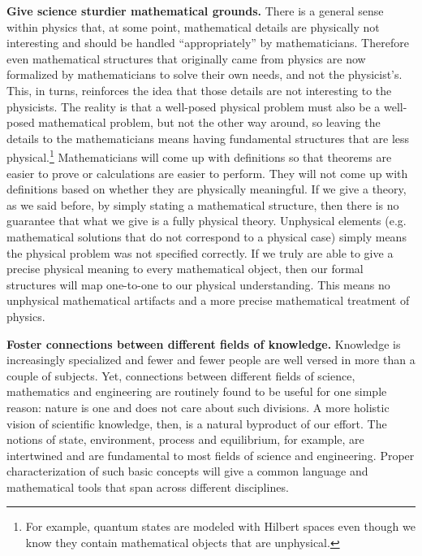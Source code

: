 \documentclass[twocolumn]{article}
\begin{document}
\textbf{Give science sturdier mathematical grounds.} There is a general sense within physics that, at some point, mathematical details are physically not interesting and should be handled ``appropriately'' by mathematicians. Therefore even mathematical structures that originally came from physics are now formalized by mathematicians to solve their own needs, and not the physicist's. This, in turns, reinforces the idea that those details are not interesting to the physicists. The reality is that a well-posed physical problem must also be a well-posed mathematical problem, but not the other way around, so leaving the details to the mathematicians means having fundamental structures that are less physical.\footnote{For example, quantum states are modeled with Hilbert spaces even though we know they contain mathematical objects that are unphysical.} Mathematicians will come up with definitions so that theorems are easier to prove or calculations are easier to perform. They will not come up with definitions based on whether they are physically meaningful. If we give a theory, as we said before, by simply stating a mathematical structure, then there is no guarantee that what we give is a fully physical theory. Unphysical elements (e.g. mathematical solutions that do not correspond to a physical case) simply means the physical problem was not specified correctly. If we truly are able to give a precise physical meaning to every mathematical object, then our formal structures will map one-to-one to our physical understanding. This means no unphysical mathematical artifacts and a more precise mathematical treatment of physics.

\textbf{Foster connections between different fields of knowledge.} Knowledge is increasingly specialized and fewer and fewer people are well versed in more than a couple of subjects. Yet, connections between different fields of science, mathematics and engineering are routinely found to be useful for one simple reason: nature is one and does not care about such divisions. A more holistic vision of scientific knowledge, then, is a natural byproduct of our effort. The notions of state, environment, process and equilibrium, for example, are intertwined and are fundamental to most fields of science and engineering. Proper characterization of such basic concepts will give a common language and mathematical tools that span across different disciplines.
\end{document}
